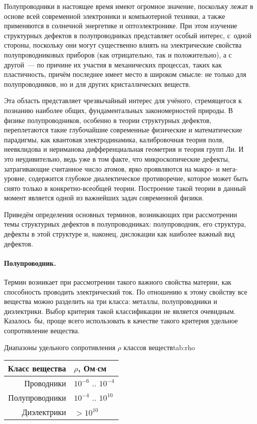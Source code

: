 \documentclass[a4paper, 14pt, titlepage]{extarticle}
\begin{document}
  Полупроводники в настоящее время имеют огромное значение, поскольку лежат в основе всей
  современной электроники и компьютерной техники, а также применяются в солнечной энергетике и
  оптоэлектронике. При этом изучение структурных дефектов в полупроводниках представляет особый
  интерес, с~одной стороны, поскольку они могут существенно влиять на электрические свойства
  полупроводниковых приборов (как отрицательно, так и положительно), а с другой~--- по причине их
  участия в механических процессах, таких как пластичность, причём последнее имеет место в широком
  смысле: не только для полупроводников, но и для других кристаллических веществ.

  Эта область представляет чрезвычайный интерес для учёного, стремящегося к познанию наиболее общих,
  фундаментальных закономерностей природы. В физике полупроводников, особенно в теории структурных
  дефектов, переплетаются такие глубочайшие современные физические и математические парадигмы, как квантовая
  электродинамика, калибровочная теория поля, неевклидова и нериманова дифференциальная геометрия и
  теория групп Ли. И это неудивительно, ведь уже в том факте, что микроскопические дефекты,
  затрагивающие считанное число атомов, ярко проявляются на макро- и мега-уровне, содержится
  глубокое диалектическое противоречие, которое может быть снято только в конкретно-всеобщей теории.
  Построение такой теории в данный момент является одной из важнейших задач современной физики.

  Приведём определения основных терминов, возникающих при рассмотрении темы структурных дефектов в
  полупроводниках: полупроводник, его структура, дефекты в этой структуре и, наконец, дислокации как
  наиболее важный вид дефектов.

  \paragraph{Полупроводник.} Термин  возникает при рассмотрении такого важного
  свойства материи, как способность проводить электрический ток. По отношению к этому свойству все
  вещества можно разделить на три класса: металлы, полупроводники и диэлектрики. Выбор критерия
  такой классификации не является очевидным. Казалось~бы, проще всего использовать в качестве такого
  критерия удельное сопротивление вещества.

  \begin{mytable}{Диапазоны удельного сопротивления $\rho$ классов веществ}{tab:rho}
    \begin{tabular}{r|l}
      Класс вещества & $\rho$, Ом$\cdot$см \\
      \hline
      Проводники     & $10^{-6}$ .. $10^{-4}$\\
      Полупроводники & $10^{-4}$ .. $10^{10}$\\
      Диэлектрики    & $> 10^{10}$\\
    \end{tabular}
  \end{mytable}
\end{document}
